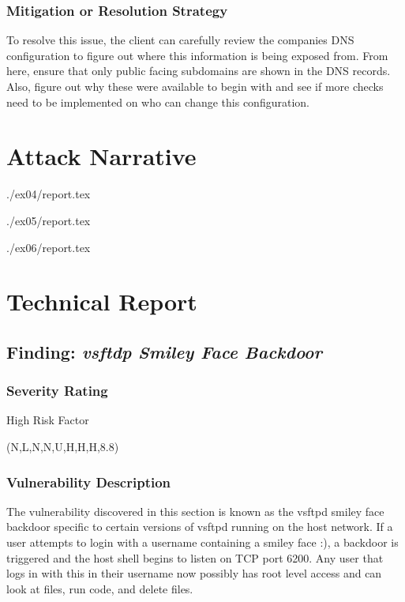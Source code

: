     \subsubsection*{Mitigation or Resolution Strategy}
        To resolve this issue, the client can carefully review the companies DNS configuration to figure out where this information is being exposed from. From here, ensure that only public facing subdomains are shown in the DNS records. Also, figure out why these were available to begin with and see if more checks need to be implemented on who can change this configuration. 

\newpage


\section{Attack Narrative}
./ex04/report.tex

./ex05/report.tex

./ex06/report.tex

\section{Technical Report}



  \subsection{Finding: \emph{vsftdp Smiley Face Backdoor}}
  
	\subsubsection*{Severity Rating}
		High Risk Factor
	   	
		\cvss(N,L,N,N,U,H,H,H,8.8)
		
  	\subsubsection*{Vulnerability Description}
  		The vulnerability discovered in this section is known as the vsftpd smiley face backdoor specific to
        certain versions of vsftpd running on the host network. If a user attempts to login with a username containing a smiley
        face :), a backdoor is triggered and the host shell begins to listen on TCP port 6200. Any user that logs in
        with this in their username now possibly has root level access and can look at files, run code, and delete files.

